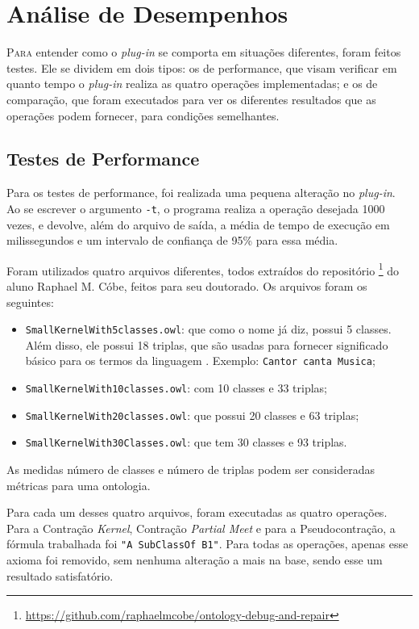 \chapter{Análise de Desempenhos}
\label{chap:testes}

\lettrine{P}{ara} entender como o \textit{plug-in} se comporta em situações diferentes, foram feitos testes. Ele se dividem em dois tipos: os de performance, que visam verificar em quanto tempo o \textit{plug-in} realiza as quatro operações implementadas; e os de comparação, que foram executados para ver os diferentes resultados que as operações podem fornecer, para condições semelhantes. 

\section{Testes de Performance}

Para os testes de performance, foi realizada uma pequena alteração no \textit{plug-in}. Ao se escrever o argumento \texttt{-t}, o programa realiza a operação desejada 1000 vezes, e devolve, além do arquivo de saída, a média de tempo de execução em milissegundos e um intervalo de confiança de 95\% para essa média.

Foram utilizados quatro arquivos diferentes, todos extraídos do repositório \footnote{\url{https://github.com/raphaelmcobe/ontology-debug-and-repair}} do aluno Raphael M. Cóbe, feitos para seu doutorado. Os arquivos foram os seguintes:

\begin{itemize}
	\item \texttt{SmallKernelWith5classes.owl}: que como o nome já diz, possui 5 classes. Além disso, ele possui 18 triplas, que são usadas para fornecer significado básico para os termos da linguagem \cite{ferramentasOWLReco2}. Exemplo: \texttt{Cantor canta Musica};
	\item \texttt{SmallKernelWith10classes.owl}: com 10 classes e 33 triplas;
	\item \texttt{SmallKernelWith20classes.owl}: que possui 20 classes e 63 triplas;
	\item \texttt{SmallKernelWith30Classes.owl}: que tem 30 classes e 93 triplas.
\end{itemize}

As medidas número de classes e número de triplas podem ser consideradas métricas para uma ontologia.

Para cada um desses quatro arquivos, foram executadas as quatro operações. Para a Contração \textit{Kernel}, Contração \textit{Partial Meet} e para a Pseudocontração, a fórmula trabalhada foi \texttt{"A SubClassOf B1"}. Para todas as operações, apenas esse axioma foi removido, sem nenhuma alteração a mais na base, sendo esse um resultado satisfatório.


